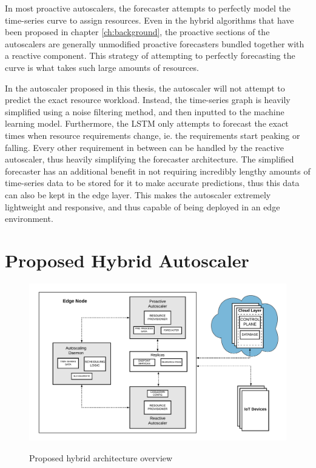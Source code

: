 In most proactive autoscalers, the forecaster attempts to perfectly model the time-series curve to assign resources. Even in the hybrid algorithms that have been proposed in chapter \ref{ch:background}, the proactive sections of the autoscalers are generally unmodified proactive forecasters bundled together with a reactive component. This strategy of attempting to perfectly forecasting the curve is what takes such large amounts of resources.\par

In the autoscaler proposed in this thesis, the autoscaler will not attempt to predict the exact resource workload. Instead, the time-series graph is heavily simplified using a noise filtering method, and then inputted to the machine learning model. Furthermore, the LSTM only attempts to forecast the exact times when resource requirements change, ie. the requirements start peaking or falling. Every other requirement in between can be handled by the reactive autoscaler, thus heavily simplifying the forecaster architecture. The simplified forecaster has an additional benefit in not requiring incredibly lengthy amounts of time-series data to be stored for it to make accurate predictions, thus this data can also be kept in the edge layer. This makes the autoscaler extremely lightweight and responsive, and thus capable of being deployed in an edge environment.\par

\section{Proposed Hybrid Autoscaler}
\label{sec:ch3-hybrid-autoscale-overview} 

\begin{figure}[htb]
    \centering
    \caption{Proposed hybrid architecture overview}
    \includegraphics[width=1.0\linewidth]{Figures/Hybrid-Architecture-Overview.pdf}
    \label{fig:hybrid-arch-overview}
\end{figure}

